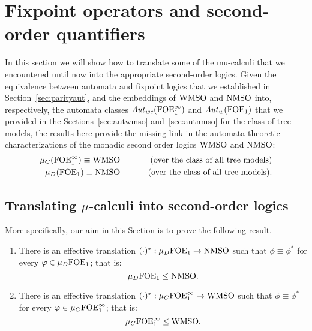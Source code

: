 \section{Fixpoint operators and second-order quantifiers}
\label{sec:fixpointToSO}

In this section we will show how to translate some of the mu-calculi that we
encountered until now into the appropriate second-order logics.
Given the equivalence between automata and fixpoint logics that we established 
in Section~\ref{sec:parityaut}, and the embeddings of $\mathrm{WMSO}$ and $\mathrm{NMSO}$ into,
respectively, the automata classes $\mathit{Aut}_{wc}(\mathrm{FOE}^{\infty}_1)$ and $\mathit{Aut}_{w}(\mathrm{FOE}_1)$ that
we provided in the Sections~\ref{sec:autwmso} and~\ref{sec:autnmso} for the 
class of tree models, the results here provide the missing link in the 
automata-theoretic characterizations of the monadic second order logics
$\mathrm{WMSO}$ and $\mathrm{NMSO}$:
\begin{eqnarray*}
   \mu_{C}(\ofoei) \equiv \wmso 
   && \qquad  \text{ (over the class of all tree models)} 
\\ \mu_{D}(\ofoe)  \equiv \nmso 
   && \qquad  \text{ (over the class of all tree models)}. 
\end{eqnarray*}

\subsection{Translating $\mu$-calculi into second-order logics}

More specifically, our aim in this Section is to prove the following result.

\begin{theorem}
\label{t:mfl2mso}
\begin{enumerate}[(1)]
\item
There is an effective translation $(\cdot)^{*}: \mu_{D}\mathrm{FOE}_1 \to \mathrm{NMSO}$
such that $\phi \equiv \phi^{*}$ for every $\varphi \in \mu_{D}\mathrm{FOE}_1$; that is:
\[
\mu_{D}\mathrm{FOE}_1 \leq \mathrm{NMSO}.
\]

\item
There is an effective translation $(\cdot)^{*}: \mu_{C}\mathrm{FOE}^{\infty}_1 \to \mathrm{WMSO}$
such that $\phi \equiv \phi^{*}$ for every $\varphi \in \mu_{C}\mathrm{FOE}^{\infty}_1$; that is:
\[
\mu_{C}\mathrm{FOE}^{\infty}_1 \leq \mathrm{WMSO}.
\]
\end{enumerate}
\end{theorem}

